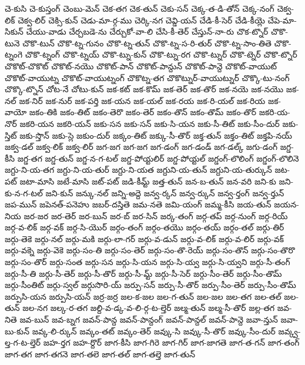 {చె-కుసి
చె-కుస్తంగ్
చెంబు-మెన్
చెక-తగ
చెక-తున్
చెకు-సన్
చెక్క-త-డి-తోన్
చెక్క-నంగ్
చెక్వ-లిక్
చెక్వ-లిర్
చెక్సి-కున్
చెడు-మా-ర్గ-ము
చెర్కి-నగ
చెవ్డి-యన్
చేడి-కీ-సెర్
చేడి-కీయ్లె
చేపె-మా-సికున్
చేయు-వాడు
చేర్చబడె-ను
చేర్చుకో-వా-లి
చేసి-కీ-తెర్
చేస్తున్-నా-రు
చొక-ట్నొర్
చొకొ-టునె
చొకొ-టున్
చొకొ-ట్న-గునం
చొకొ-ట్న-తున్
చొకొ-ట్న-స-రి-తుర్
చొకొ-ట్న-సాం-తితె
చొకొ-ట్నంగె
చొకొ-ట్నంగ్
చొకొ-ట్నయ్
చొకొ-ట్ను-కున్
చొకొ-ట్ను-రగ
చొకొ-ట్నుర్
చొకొ-ట్నెర్
చొకొ-ట్నొర్
చొకొట్-చొకొట్
చొకొట్-నయొ
చొకొట్-పాన్
చొకొట్-పాన్దున్
చొకొట్-పాన్దె
చొకొట్-వాయుట్
చొకొట్-వాయుట్న
చొకొట్-వాయుట్నంగ్
చొకొట్న-తగ
చొకొట్నుర్-వాయుట్నుర్
చొక్కొ-టు-నంగ్
చొక్కొ-ట్నొన్
చోట-నే
చోటు-కున్
జక-కట్
జక-కొమ్
జక-తెర్
జక-తొర్
జక-నయె
జక-నయొ
జక-నల్
జక-నిర్
జక-నుర్
జక-పర్తి
జక-యన
జక-యల్
జక-రయ
జక-రి-యల్
జక-రియ
జక-వాయో
జకం-తికి
జకం-తిట్
జకం-తెరొ
జకం-తెర్
జకం-తొన్
జకం-తొమ్
జకం-తొర్
జకరి-య-నొర్
జకరి-యన
జకరి-యన్
జకు-సన
జకు-సన్
జకు-సి-యన
జకు-సీ-తిట్
జకు-సీం-దుర్
జకు-స్తిట్
జకు-స్తొన్
జకు-స్లె
జకుం-దుర్
జక్కం-తిట్
జక్కు-సీ-తొర్
జక్త-తున్
జక్తం-తిట్
జక్తపి-నయ్
జక్వ-డల్
జక్వ-లిక్
జక్వ-లిర్
జగ-జగ
జగ-జగ
జగ-డంగ్
జగ-డండ్
జగ-డల్క్
జగు-డంగ్
జగ్డ-కీసి
జగ్డ-తగ
జగ్డ-తున్
జగ్డ-న-గ-టల్
జగ్డ-పోయ్టలిర్
జగ్డ-పోయ్టల్
జగ్డంగ్-లొలింగ్
జగ్డంగ్-లొలినె
జగ్దు-ని-య-తగ
జగ్దు-ని-య-తుర్
జగ్దు-ని-యత
జగ్దుని-య-తున్
జగ్దుని-య-తుర్కున్
జట-పట్
జటా-మాసి
జటే-మాసి
జట్-పట్
జడి-కీమ్ట్
జత్త-తున్
జన-బ-తున్
జన-వరి
జని-కు
జని-కు-న-గ-టల్
జని-కున్
జన్కు-నల్
జన్ని-అద్దె
జన్వ-ర్కన్
జన్వ-ర్కున్
జన్వ-ర్తంగ్
జన్వ-ర్తున్
జప-మున్
జపెనత్-పనెహు
జబర్-దస్తితె
జమ-నతె
జమి-యంగ్
జమ్మ-కీసి
జయ-తున్
జయన-నియ
జర-జర
జర-తెర్
జర-బున్
జర-బ్
జర-సిన్
జర్క-తంగ్
జర్గ-తప్
జర్గ-నుంగ్
జర్గ-రియ్
జర్గ-వ-లిక్
జర్గ-వక్
జర్గ-సి-యొర్
జర్గం-తంగ్
జర్గం-తయొ
జర్గం-తయ్
జర్గం-తల్
జర్గు-తిర్
జర్గు-తెకె
జర్గు-నల్
జర్గు-మకి
జర్గు-లా-గర్
జర్గు-వ-డున్
జర్గు-వ-లిక్
జర్గు-వ-లిర్
జర్గు-వక్
జర్గు-వక్నె
జర్గు-వెకె
జర్గు-సం-తి
జర్గు-సం-తెర్
జర్గు-సం-తొ-రెయ్
జర్గు-సం-తొన్
జర్గు-సం-తొరొ
జర్గు-సం-తొర్
జర్గు-సంత
జర్గు-సన
జర్గు-సి-యన
జర్గు-సి-య్వ
జర్గు-సి-య్వని
జర్గు-సీ-తంగ్
జర్గు-సీ-తి
జర్గు-సీ-తెర్
జర్గు-సీ-తొర్
జర్గు-సీ-మ్ట్
జర్గు-సీ-సెర్
జర్గు-సీం-తెర్
జర్గు-సీం-తొమ్
జర్గు-సీంతిట్
జర్గు-స్వల్
జర్గుసొరి-య్
జర్పు-సన్
జర్పు-సీ-తొర్
జర్పు-సీం-తెర్
జర్పు-సీం-తొమ్
జర్పుసి-యన
జర్పుసి-యన్
జర్ర-జర్ర
జల-క-జల
జల-గ-తున్
జల-జల
జల-తగ
జల-తల్
జల-తున్
జల-నగ
జల్క-ర-తగ
జల్ది-వ-డ్క-వ-లి-ర్గ-ట-ల్తెర్
జల్మ-తున్
జల్మ-సీ-తొర్
జల్ల-తగ
జవ-నితె
జవ-బున్
జవ-బ్నగ
జవన్-పాన్ద
జవన్-పాన్దంగ్
జవన్-పాన్దల్
జవన్-పాన్దె
జవా-న్తున్
జవా-బు-కున్
జవ్క-లి-ర్కున్
జవ్కం-తట్
జవ్కం-తెర్
జవ్కు-సి
జవ్కు-సీ-తొర్
జవ్కు-సీం-దుర్
జవ్క్వ-ల్త-గ-ట-ల్తెర్
జహ-ర్తగ
జహ-ర్దొర్
జాగ-కీసి
జాగ-గిరె
జాగ-గిర్
జాగ-జాగతె
జాగ-త-గన్
జాగ-తంగ్
జాగ-తగ
జాగ-తగనె
జాగ-తలె
జాగ-తల్
జాగ-తల్తె
జాగ-తున్
}
